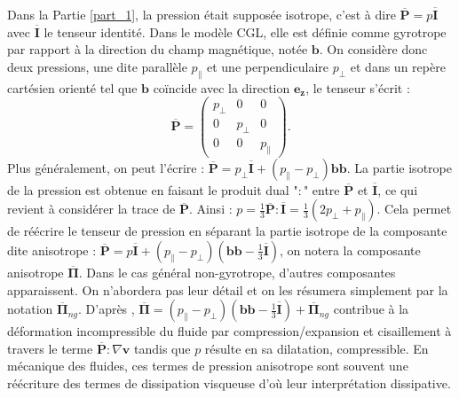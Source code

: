  Dans la Partie \ref{part_1}, la pression était supposée isotrope, c'est à dire $\overline{\boldsymbol{P}} = p \overline{\boldsymbol{I}}$ avec $\overline{\boldsymbol{I}}$ le tenseur identité. Dans le modèle \ac{CGL}, elle est définie comme gyrotrope par rapport à la direction du champ magnétique, notée $\boldsymbol{b}$. On considère donc deux pressions, une dite parallèle $p_{\parallel}$ et une perpendiculaire $p_{\perp}$ et dans un repère cartésien orienté tel que $\boldsymbol{b}$ coïncide avec la direction $\boldsymbol{e_z}$, le tenseur s'écrit : 
\begin{equation*}
 \overline{\boldsymbol{P}} = \left( \begin{array}{ccc}
                                    p_{\perp} & 0 & 0 \\
                                    0 & p_{\perp} & 0 \\
                                    0 & 0 & p_{\parallel} 
                                    \end{array} \right).   
\end{equation*}
Plus généralement, on peut l'écrire : $ \overline{\boldsymbol{P}} = p_{\perp} \overline{\boldsymbol{I}} + \left(p_{\parallel} - p_{\perp}\right) \boldsymbol{b}\boldsymbol{b} $. La partie isotrope de la pression est obtenue en faisant le produit dual "$:$" entre $\overline{\boldsymbol{P}}$ et  $\overline{\boldsymbol{I}}$, ce qui revient à considérer la trace de $\overline{\boldsymbol{P}}$. Ainsi : $p = \frac{1}{3} \overline{\boldsymbol{P}} : \overline{\boldsymbol{I}} = \frac{1}{3} \left(2 p_{\perp} + p_{\parallel} \right) $. Cela permet de réécrire le tenseur de pression en séparant la partie isotrope de la composante dite anisotrope : $\overline{\boldsymbol{P}} = p \overline{\boldsymbol{I}} + \left(p_{\parallel} - p_{\perp}\right)\left(\boldsymbol{b}\boldsymbol{b} - \frac{1}{3} \overline{\boldsymbol{I}} \right)$, on notera la composante anisotrope $\overline{\boldsymbol{\Pi}}$. Dans le cas général non-gyrotrope, d'autres composantes apparaissent. On n'abordera pas leur détail et on les résumera simplement par la notation $\overline{\boldsymbol{\Pi}}_{ng}$. D'après \cite{cassak_pressure-strain_2022}, $\overline{\boldsymbol{\Pi}} = \left(p_{\parallel} - p_{\perp}\right)\left(\boldsymbol{b}\boldsymbol{b} - \frac{1}{3} \overline{\boldsymbol{I}} \right) + \overline{\boldsymbol{\Pi}}_{ng}$ contribue à la déformation incompressible du fluide par compression/expansion et cisaillement à travers le terme $\overline{\boldsymbol{P}} : \nabla \boldsymbol{v}$ tandis que $p$ résulte en sa dilatation, compressible. En mécanique des fluides, ces termes de pression anisotrope sont souvent une réécriture des termes de dissipation visqueuse d'où leur interprétation dissipative. 

